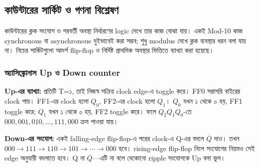\subsection{কাউন্টারের সার্কিট ও গণনা বিশ্লেষণ}
কাউন্টারের ক্লক সংযোগ ও পরবর্তী অবস্থা নির্ধারণের logic দেখে তার কাজ বোঝা যায়। একই Mod-10 কাজ synchronous বা asynchronous দুইভাবেই করা সম্ভব; শুধু modulus দেখে ক্লক ব্যবস্থার ধরন বলা যায় না। নিচের সার্কিটগুলো আদর্শ flip-flop ও নির্দিষ্ট প্রাথমিক অবস্থার ভিত্তিতে ব্যাখ্যা করা হয়েছে।

\subsubsection*{অ্যাসিঙ্ক্রোনাস Up ও Down counter}
\begin{center}
\begin{minipage}{\linewidth}\centering\begin{chThreeDiagram}\end{chThreeDiagram}

\end{minipage}
\end{center}
\textbf{Up-এর ব্যাখ্যা:} প্রতিটি T=১, তাই নিজস্ব সক্রিয় clock edge-এ toggle করে। FF0 সরাসরি বাইরের clock পায়। FF1-এর clock হলো $Q_0$, FF2-এর clock হলো $Q_1$। $Q_0$ যখন ১ থেকে ০ হয়, FF1 toggle করে; $Q_1$ যখন ১ থেকে ০ হয়, FF2 toggle করে। ফলে $Q_2Q_1Q_0$-তে $000,001,010,\ldots,111,000$ ক্রম পাওয়া যায়।

\textbf{Down-এর সংযোগ:} একই falling-edge flip-flop-এ পরের clock-এ Q-এর বদলে $\overline Q$ দাও। তখন $000\to111\to110\to101\to\cdots\to000$ হবে। rising-edge flip-flop নিলে সংযোগের নিয়মও সেই edge অনুযায়ী বদলাতে হবে। Q না $\overline Q$—এটি না বলে যেকোনো ripple সংযোগকে Up বলা ভুল।

